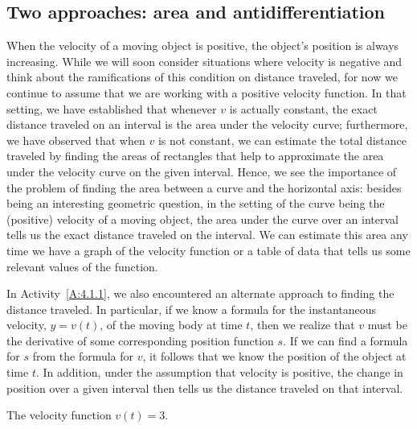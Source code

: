 
\subsection*{Two approaches: area and antidifferentiation}

When the velocity of a moving object is positive, the object's position is always increasing.  While we will soon consider situations where velocity is negative and think about the ramifications of this condition on distance traveled, for now we continue to assume that we are working with a positive velocity function.  In that setting, we have established that whenever $v$ is actually constant, the exact distance traveled on an interval is the area under the velocity curve; furthermore, we have observed that when $v$ is not constant, we can estimate the total distance traveled by finding the areas of rectangles that help to approximate the area under the velocity curve on the given interval.  Hence, we see the importance of the problem of finding the area between a curve and the horizontal axis:  besides being an interesting geometric question, in the setting of the curve being the (positive) velocity of a moving object, the area under the curve over an interval tells us the exact distance traveled on the interval.  We can estimate this area any time we have a graph of the velocity function or a table of data that tells us some relevant values of the function.

In Activity~\ref{A:4.1.1}, we also encountered an alternate approach to finding the distance traveled.  In particular, if we know a formula for the instantaneous velocity, $y = v(t)$, of the moving body at time $t$, then we realize that $v$ must be the derivative of some corresponding position function $s$.  If we can find a formula for $s$ from the formula for $v$, it follows that we know the position of the object at time $t$.  In addition, under the assumption that velocity is positive, the change in position over a given interval then tells us the distance traveled on that interval.  

\begin{marginfigure}[0cm] %
\caption{The velocity function $v(t) = 3$.} \label{fig:preview_4-1asolution}
\end{marginfigure}

